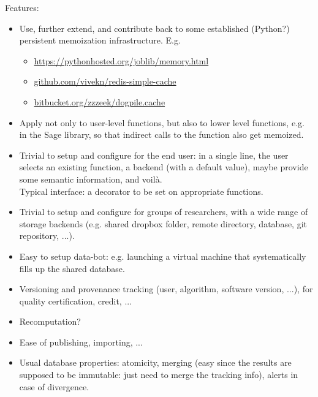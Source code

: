 \begin{Workpackage}{\thewpno}
\begin{WPDeliverables}
\begin{itemize}
  Features:
  \begin{itemize}
  \item Use, further extend, and contribute back to some established
    (Python?) persistent memoization infrastructure. E.g.
    \begin{itemize}
    \item \url{https://pythonhosted.org/joblib/memory.html}
    \item \url{github.com/vivekn/redis-simple-cache}
    \item \url{bitbucket.org/zzzeek/dogpile.cache}
    \end{itemize}
  \item Apply not only to user-level functions, but also to lower
    level functions, e.g. in the Sage library, so that indirect calls
    to the function also get memoized.
  \item Trivial to setup and configure for the end user: in a single
    line, the user selects an existing function, a backend (with a
    default value), maybe provide some semantic information, and
    voilà. \\
    Typical interface: a decorator to be set on appropriate functions.
  \item Trivial to setup and configure for groups of researchers, with
    a wide range of storage backends (e.g. shared dropbox folder,
    remote directory, database, git repository, ...).
  \item Easy to setup data-bot: e.g. launching a virtual machine that
    systematically fills up the shared database.
  \item Versioning and provenance tracking (user, algorithm, software
    version, ...), for quality certification, credit, ...
  \item Recomputation?
  \item Ease of publishing, importing, ...
  \item Usual database properties: atomicity, merging (easy since the
    results are supposed to be immutable: just need to merge the
    tracking info), alerts in case of divergence.
  \end{itemize}
\end{itemize}
\end{WPDeliverables}
\end{Workpackage}
